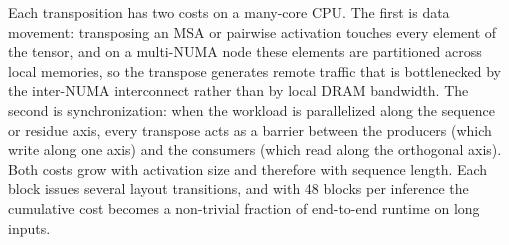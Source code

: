 Each transposition has two costs on a many-core CPU. The first is data movement: transposing an MSA or pairwise activation touches every element of the tensor, and on a multi-NUMA node these elements are partitioned across local memories, so the transpose generates remote traffic that is bottlenecked by the inter-NUMA interconnect rather than by local DRAM bandwidth. The second is synchronization: when the workload is parallelized along the sequence or residue axis, every transpose acts as a barrier between the producers (which write along one axis) and the consumers (which read along the orthogonal axis). Both costs grow with activation size and therefore with sequence length.
Each block issues several layout transitions, and with 48 blocks per inference the cumulative cost becomes a non-trivial fraction of end-to-end runtime on long inputs. %



